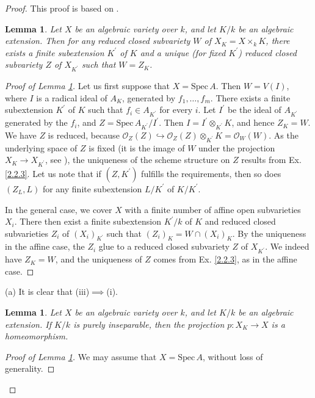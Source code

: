 \documentclass{amsart}
\newtheorem{lm}[theorem]{Lemma}
\theoremstyle{remark}\newtheorem{rmk}[theorem]{Remark}
\begin{document}
\begin{proof}
	This proof is based on \cite[P. 89-91]{LIU}.
	\begin{lm}
		\label{l16}
		Let $X$ be an algebraic variety over $k$, and let $K/k$ be an algebraic extension. Then for any reduced closed subvariety $W$ of $X_K=X\times_kK$, there exists a finite subextension $K^{\prime}$ of $K$ and a unique (for fixed $K^{\prime}$) reduced closed subvariety $Z$ of $X_{K^{\prime}}$ such that $W=Z_K$.
	\end{lm}
    \begin{proof}[Proof of Lemma \ref{l16}]
    	Let us first suppose that $X=\mathrm{Spec}\,A$. Then $W=V(I)$, where $I$ is a radical ideal of $A_K$, generated by $f_1,\dots,f_m$. There exists a finite subextension $K^{\prime}$ of $K$ such that $f_i\in A_{K^{\prime}}$ for every $i$. Let $I^{\prime}$ be the ideal of $A_{K^{\prime}}$ generated by the $f_i$, and $Z=\mathrm{Spec}\,A_{K^{\prime}}/I^{\prime}$. Then $I=I^{\prime}\otimes_{K^{\prime}}K$, and hence $Z_K=W$. We have $Z$ is reduced, because $\mathcal{O}_Z(Z)\hookrightarrow\mathcal{O}_Z(Z)\otimes_{K^{\prime}}K=\mathcal{O}_W(W)$. As the underlying space of $Z$ is fixed (it is the image of $W$ under the projection $X_K\to X_{K^{\prime}}$, see \cite[Ch. 3, Ex. 1.8, P.86]{LIU}), the uniqueness of the scheme structure on $Z$ results from Ex. \ref{2.2.3}. Let us note that if $(Z,K^{\prime})$ fulfills the requirements, then so does $(Z_L,L)$ for any finite subextension $L/K^{\prime}$ of $K/K^{\prime}$.
    	
    	In the general case, we cover $X$ with a finite number of affine open subvarieties $X_i$. There then exist a finite subextension $K^{\prime}/k$ of $K$ and reduced closed subvarieties $Z_i$ of $(X_i)_{K^{\prime}}$ such that $(Z_i)_K=W\cap(X_i)_K$. By the uniqueness in the affine case, the $Z_i$ glue to a reduced closed subvariety $Z$ of $X_{K^{\prime}}$. We indeed have $Z_K=W$, and the uniqueness of $Z$ comes from Ex. \ref{2.2.3}, as in the affine case.
    \end{proof}
    (a) It is clear that (iii)$\implies$(i).
	\begin{lm}
		\label{l17}
		Let $X$ be an algebraic variety over $k$, and let $K/k$ be an algebraic extension. If $K/k$ is purely inseparable, then the projection $p:X_K\to X$ is a homeomorphism.
	\end{lm}
    \begin{proof}[Proof of Lemma \ref{l17}]
    	We may assume that $X=\mathrm{Spec}\,A$, without loss of generality. 
    	

\end{proof}
\end{proof}
\end{document}
